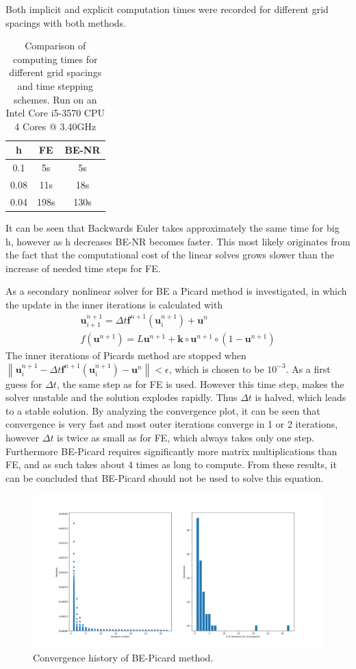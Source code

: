 \documentclass{article}
\newcommand{\norm}[1]{\left\lVert#1\right\rVert}
\begin{document}
Both implicit and explicit computation times were recorded for different grid spacings with both methods.
\begin{table}[H]
\centering
\begin{tabular}{c|c|c}
	h & FE & BE-NR \\\hline
	0.1 & 5s & 5s\\ \hline
	0.08 & 11s & 18s\\ \hline
	0.04 & 198s & 130s
\end{tabular}
\caption{Comparison of computing times for different grid spacings and time stepping schemes. Run on an Intel Core i5-3570 CPU  4 Cores @ 3.40GHz}
\end{table}
It can be seen that Backwards Euler takes approximately the same time for big h, however as h decreases BE-NR becomes faster. This most likely originates from the fact that the computational cost of the linear solves grows slower than the increase of needed time steps for FE.\par
As a secondary nonlinear solver for BE a Picard method is investigated, in which the update in the inner iterations is calculated with
\begin{align}
\mathbf{u}_{i+1}^{n+1}=\Delta t \mathbf{f}^{n+1}\left(\mathbf{u}_{i}^{n+1}\right)+\mathbf{u}^{n}\\
f(\mathbf{u}^{n+1})=L \mathbf{u}^{n+1} + \mathbf{k}\circ\mathbf{u}^{n+1}\circ\left(1-\mathbf{u}^{n+1}\right)
\end{align}
The inner iterations of Picards method are stopped when $\norm{\mathbf{u}_{i}^{n+1}-\Delta t \mathbf{f}^{n+1}\left(\mathbf{u}_{i}^{n+1}\right)-\mathbf{u}^{n}} < \epsilon$, which is chosen to be $10^{-3}$. As a first guess for $\Delta t$, the same step as for FE is used. However this time step, makes the solver unstable and the solution explodes rapidly. Thus $\Delta t$ is halved, which leads to a stable solution. By analyzing the convergence plot, it can be seen that convergence is very fast and most outer iterations converge in 1 or 2 iterations, however $\Delta t$ is twice as small as for FE, which always takes only one step. Furthermore BE-Picard requires significantly more matrix multiplications than FE, and as such takes about 4 times as long to compute. From these results, it can be concluded that BE-Picard should not be used to solve this equation.

\begin{figure}[H]
	\centering
	\includegraphics[width=.9\linewidth]{4ConvergencePicard.png}
	\caption{Convergence history of BE-Picard method.}
\end{figure}
\end{document}
